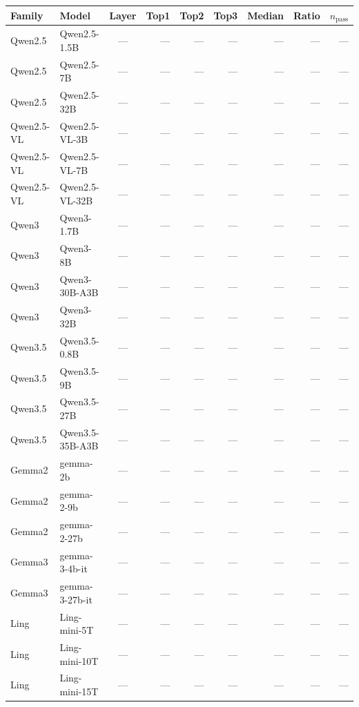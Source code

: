 \begin{table}[t]
\centering
\small
\setlength{\tabcolsep}{4pt}
\begin{tabular}{llcrrrrrr}
\toprule
Family & Model & Layer & Top1 & Top2 & Top3 & Median & Ratio & $n_{\text{pass}}$ \\
\midrule
Qwen2.5 & Qwen2.5-1.5B & --- & --- & --- & --- & --- & --- & --- \\
Qwen2.5 & Qwen2.5-7B & --- & --- & --- & --- & --- & --- & --- \\
Qwen2.5 & Qwen2.5-32B & --- & --- & --- & --- & --- & --- & --- \\
Qwen2.5-VL & Qwen2.5-VL-3B & --- & --- & --- & --- & --- & --- & --- \\
Qwen2.5-VL & Qwen2.5-VL-7B & --- & --- & --- & --- & --- & --- & --- \\
Qwen2.5-VL & Qwen2.5-VL-32B & --- & --- & --- & --- & --- & --- & --- \\
Qwen3 & Qwen3-1.7B & --- & --- & --- & --- & --- & --- & --- \\
Qwen3 & Qwen3-8B & --- & --- & --- & --- & --- & --- & --- \\
Qwen3 & Qwen3-30B-A3B & --- & --- & --- & --- & --- & --- & --- \\
Qwen3 & Qwen3-32B & --- & --- & --- & --- & --- & --- & --- \\
Qwen3.5 & Qwen3.5-0.8B & --- & --- & --- & --- & --- & --- & --- \\
Qwen3.5 & Qwen3.5-9B & --- & --- & --- & --- & --- & --- & --- \\
Qwen3.5 & Qwen3.5-27B & --- & --- & --- & --- & --- & --- & --- \\
Qwen3.5 & Qwen3.5-35B-A3B & --- & --- & --- & --- & --- & --- & --- \\
Gemma2 & gemma-2b & --- & --- & --- & --- & --- & --- & --- \\
Gemma2 & gemma-2-9b & --- & --- & --- & --- & --- & --- & --- \\
Gemma2 & gemma-2-27b & --- & --- & --- & --- & --- & --- & --- \\
Gemma3 & gemma-3-4b-it & --- & --- & --- & --- & --- & --- & --- \\
Gemma3 & gemma-3-27b-it & --- & --- & --- & --- & --- & --- & --- \\
Ling & Ling-mini-5T & --- & --- & --- & --- & --- & --- & --- \\
Ling & Ling-mini-10T & --- & --- & --- & --- & --- & --- & --- \\
Ling & Ling-mini-15T & --- & --- & --- & --- & --- & --- & --- \\

\end{tabular}
\end{table}
